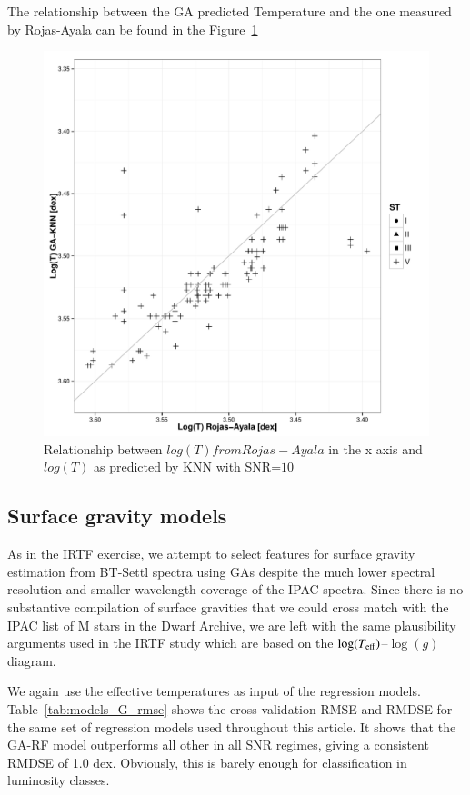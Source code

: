 The relationship between the GA predicted Temperature and the one
measured by Rojas-Ayala can be found in the
Figure~\ref{fig:ipac_lt_lt}
\begin{figure}
 \begin{center}
 \includegraphics[width=12cm]{figs/ipac_LG_Trojas_Tknn_10.pdf}
 \caption{Relationship between $log(T) from Rojas-Ayala $ in the x axis 
 and $log(T)$ as predicted by KNN with SNR=$10$}
 \label{fig:ipac_lt_lt}
 \end{center}
\end{figure}

\subsection{Surface gravity models}

As in the IRTF exercise, we attempt to select features for surface
gravity estimation from BT-Settl spectra using GAs despite the much
lower spectral resolution and smaller wavelength coverage of the IPAC
spectra. Since there is no substantive compilation of surface
gravities that we could cross match with the IPAC list of M stars in
the Dwarf Archive, we are left with the same plausibility arguments
used in the IRTF study which are based on the $\log(T_{\rm
  eff})$--$\log(g)$ diagram.

We again use the effective temperatures as input of the regression
models. Table~\ref{tab:models_G_rmse} shows the cross-validation RMSE
and RMDSE for the same set of regression models used throughout this
article. It shows that the GA-RF model outperforms all other in all
SNR regimes, giving a consistent RMDSE of 1.0 dex. Obviously, this is
barely enough for classification in luminosity classes.

